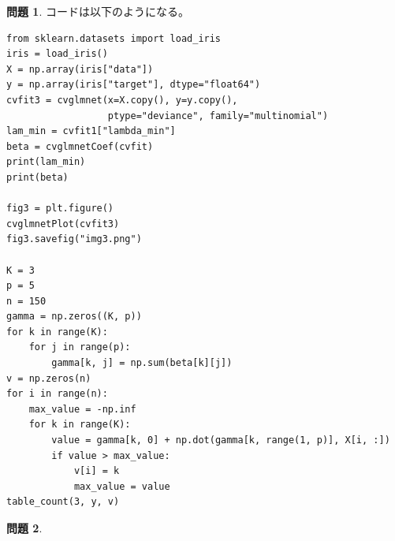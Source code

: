 \documentclass[titlepage]{jsarticle}
\theoremstyle{definition}
\newtheorem{Ex}{問題}
\theoremstyle{mystyle} %
\renewcommand{\footnotesize}{\normalsize}
\begin{document}
\begin{Ex}
コードは以下のようになる。

\begin{lstlisting}[basicstyle = \ttfamily\footnotesize, frame = single]
from sklearn.datasets import load_iris
iris = load_iris()
X = np.array(iris["data"])
y = np.array(iris["target"], dtype="float64")
cvfit3 = cvglmnet(x=X.copy(), y=y.copy(),
                  ptype="deviance", family="multinomial")
lam_min = cvfit1["lambda_min"]
beta = cvglmnetCoef(cvfit)
print(lam_min)
print(beta)

fig3 = plt.figure()
cvglmnetPlot(cvfit3)
fig3.savefig("img3.png")

K = 3
p = 5
n = 150
gamma = np.zeros((K, p))
for k in range(K):
    for j in range(p):
        gamma[k, j] = np.sum(beta[k][j])
v = np.zeros(n)
for i in range(n):
    max_value = -np.inf
    for k in range(K):
        value = gamma[k, 0] + np.dot(gamma[k, range(1, p)], X[i, :])
        if value > max_value:
            v[i] = k
            max_value = value
table_count(3, y, v)
\end{lstlisting}

\end{Ex}
\begin{Ex}

\end{Ex}
\end{document}
